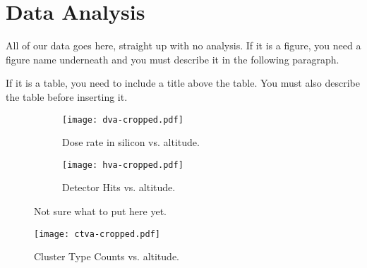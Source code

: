 \section{Data Analysis}
\label{Data Analysis}
All of our data goes here, straight up with no analysis.  If it is a figure, you need a figure name underneath and you must describe it in the following paragraph.  

If it is a table, you need to include a title above the table.  You must also describe the table before inserting it.  

\begin{figure}
\centering
\begin{subfigure}{.5\textwidth}
  \centering
  \texttt{[image: dva-cropped.pdf]}
  \caption{Dose rate in silicon vs. altitude.}
  \label{fig:sub1}
\end{subfigure}%
\begin{subfigure}{.5\textwidth}
  \centering
  \texttt{[image: hva-cropped.pdf]}
  \caption{Detector Hits vs. altitude.}
  \label{fig:sub2}
\end{subfigure}
\caption{Not sure what to put here yet.}
\label{fig:test}
\end{figure}

\begin{figure}[h]
\centering
\caption{Cluster Type Counts vs. altitude.}
\texttt{[image: ctva-cropped.pdf]}
\end{figure}

